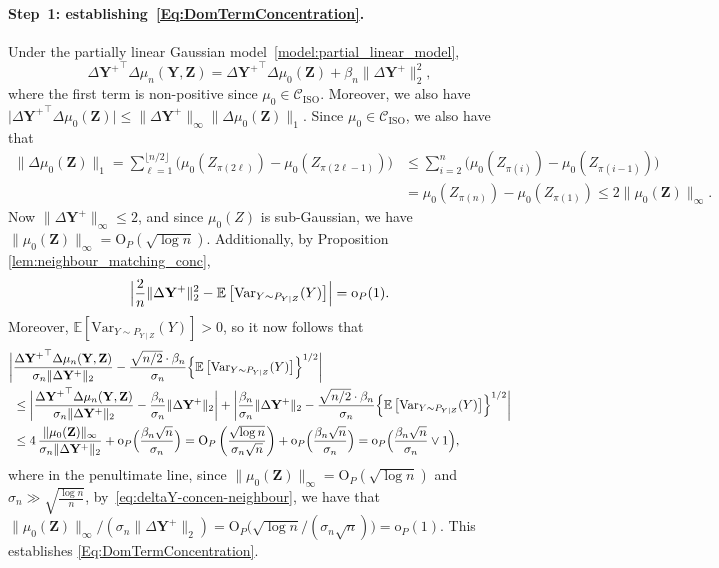 \documentclass[12pt]{article}
\newcommand{\EE}[1]{\mathbb{E}\left[{#1}\right]}
\newcommand{\VPst}[2]{\mathrm{Var}_{{#1}}({#2})}
\newcommand{\ISO}{\mathrm{ISO}}
\newcommand{\bY}{\mathbf{Y}}
\newcommand{\bZ}{\mathbf{Z}}
\begin{document}
    \paragraph{Step~1: establishing~\eqref{Eq:DomTermConcentration}.}
    Under the partially linear Gaussian model~\eqref{model:partial_linear_model},
    \begin{equation}\label{eq:decomposition_delY_delmu}
        {\Delta\bY^+}^\top\Delta\mu_n(\bY,\bZ)={\Delta\bY^+}^\top\Delta\mu_0(\bZ)+\beta_n \|\Delta\bY^+\|_2^2,
    \end{equation}
    where the first term is non-positive since $\mu_0\in\mathcal{C}_\ISO$.  Moreover, we also have $\bigl|{\Delta\bY^+}^\top\Delta\mu_0(\bZ)\bigr| \leq \|\Delta\bY^+\|_\infty\|\Delta\mu_0(\bZ)\|_1$.  Since $\mu_0\in \mathcal{C}_\ISO$,  we also have that
    \begin{align}\label{eq:bound-on-l1-norm-of-delmu0-neighbour}
    \|\Delta\mu_0(\bZ)\|_1=\sum_{\ell=1}^{\lfloor n/2\rfloor} \bigl(\mu_0(Z_{\pi(2\ell)})-\mu_0(Z_{\pi(2\ell-1)})\bigr)&\leq \sum_{i=2}^n \bigl(\mu_0(Z_{\pi(i)})-\mu_0(Z_{\pi(i-1)})\bigr)\nonumber\\
        &=\mu_0(Z_{\pi(n)})-\mu_0(Z_{\pi(1)})\leq 2\|\mu_0(\bZ)\|_\infty.
    \end{align} 
    Now $\|\Delta\bY^+\|_\infty \leq 2$, and since $\mu_0(Z)$ is sub-Gaussian, we have $\|\mu_0(\bZ)\|_\infty = \mathrm{O}_P(\sqrt{\log n})$.
    Additionally, by Proposition \ref{lem:neighbour_matching_conc}, 
     \begin{equation}\label{eq:deltaY-concen-neighbour}
         \Bigl|\frac{2}{n}\|\Delta\bY^+\|_2^2-\EE{\VPst{Y\sim P_{Y\mid Z}}{Y}}\Bigr|=\mathrm{o}_P(1).
     \end{equation}
      Moreover, $\EE{\VPst{Y\sim P_{Y\mid Z}}{Y}} > 0$, so it now follows that
     \begin{align*}
         \biggl|&\frac{{\Delta\bY^+}^\top \Delta \mu_n(\bY,\bZ)}{\sigma_n\|\Delta\bY^+\|_2}-\frac{\sqrt{n/2}\cdot\beta_n}{\sigma_n}\Bigl\{\EE{\VPst{Y\sim P_{Y\mid Z}}{Y}}\Bigr\}^{1/2}\biggr| \\
         &\leq\biggl|\frac{{\Delta\bY^+}^\top \Delta \mu_n(\bY,\bZ)}{\sigma_n\|\Delta\bY^+\|_2}-\frac{\beta_n}{\sigma_n}\|\Delta\bY^+\|_2\biggr|+\biggl|\frac{\beta_n}{\sigma_n}\|\Delta\bY^+\|_2-\frac{\sqrt{n/2}\cdot\beta_n}{\sigma_n}\Bigl\{\EE{\VPst{Y\sim P_{Y\mid Z}}{Y}}\Bigr\}^{1/2}\biggr|\\
         &\leq 4\,\frac{\|\mu_0(\bZ)\|_\infty}{\sigma_n\|\Delta\bY^+\|_2} + \mathrm{o}_P\Bigl(\frac{\beta_n\sqrt{n}}{\sigma_n}\Bigr) = \mathrm{O}_P\left(\frac{\sqrt{\log n}}{\sigma_n\sqrt{n}}\right) + \mathrm{o}_P\Bigl(\frac{\beta_n\sqrt{n}}{\sigma_n}\Bigr)=\mathrm{o}_P\Bigl(\frac{\beta_n\sqrt{n}}{\sigma_n}\vee 1\Bigr), 
     \end{align*}
     where in the penultimate line,
      since $\|\mu_0(\bZ)\|_\infty = \mathrm{O}_P(\sqrt{\log n})$ and $\sigma_n\gg \sqrt{\frac{\log n}{n}}$, by~\eqref{eq:deltaY-concen-neighbour}, we have that $\|\mu_0(\bZ)\|_\infty/(\sigma_n\|\Delta\bY^+\|_2)=\mathrm{O}_P\bigl(\sqrt{\log n}/(\sigma_n\sqrt{n})\bigr) = \mathrm{o}_P(1)$.
     This establishes \eqref{Eq:DomTermConcentration}.
\end{document}
